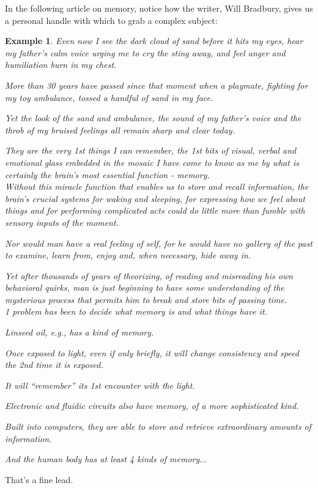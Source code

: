 \documentclass{book}
\numberwithin{equation}{section}
\newtheorem{example}{Example}[chapter]
\begin{document}
In the following article on memory, notice how the writer, Will Bradbury, gives us a personal handle with which to grab a complex subject:
\begin{example}
    Even now I see the dark cloud of sand before it hits my eyes, hear my father's calm voice urging me to cry the sting away, and feel anger and humiliation burn in my chest.
    
    More than 30 years have passed since that moment when a playmate, fighting for my toy ambulance, tossed a handful of sand in my face.
    
    Yet the look of the sand and ambulance, the sound of my father's voice and the throb of my bruised feelings all remain sharp and clear today.
    
    They are the very 1st things I can remember, the 1st bits of visual, verbal and emotional glass embedded in the mosaic I have come to know as \emph{me} by what is certainly the brain's most essential function - memory.
    \\
    
    Without this miracle function that enables us to store and recall information, the brain's crucial systems for waking and sleeping, for expressing how we feel about things and for performing complicated acts could do little more than fumble with sensory inputs of the moment.
    
    Nor would man have a real feeling of self, for he would have no gallery of the past to examine, learn from, enjoy and, when necessary, hide away in.
    
    Yet after thousands of years of theorizing, of reading and misreading his own behavioral quirks, man is just beginning to have some understanding of the mysterious process that permits him to break and store bits of passing time.
    \\
    
    1 problem has been to decide what memory is and what things have it.
    
    Linseed oil, e.g., has a kind of memory.
    
    Once exposed to light, even if only briefly, it will change consistency and speed the \textit{2nd} time it is exposed.
    
    It will ``remember'' its 1st encounter with the light.
    
    Electronic and fluidic circuits also have memory, of a more sophisticated kind.
    
    Built into computers, they are able to store and retrieve extraordinary amounts of information.
    
    And the human body has at least 4 kinds of memory$\ldots$
\end{example}
That's a fine lead.
\end{document}
